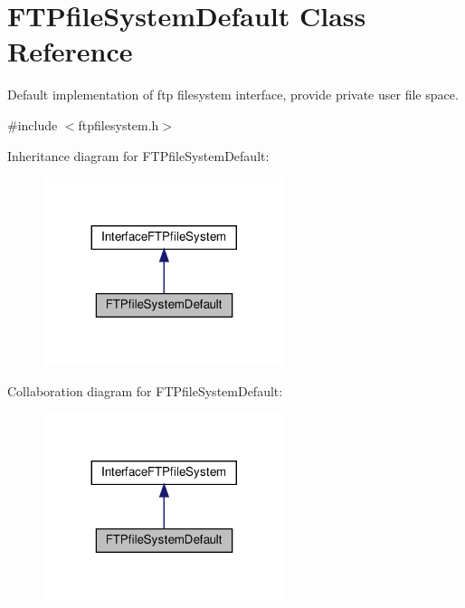 \hypertarget{classFTPfileSystemDefault}{}\section{F\+T\+Pfile\+System\+Default Class Reference}
\label{classFTPfileSystemDefault}


Default implementation of ftp filesystem interface, provide private user file space.  




{\ttfamily \#include $<$ftpfilesystem.\+h$>$}



Inheritance diagram for F\+T\+Pfile\+System\+Default\+:\nopagebreak
\begin{figure}[H]
\begin{center}
\leavevmode
\includegraphics[width=200pt]{d9/d6b/classFTPfileSystemDefault__inherit__graph}
\end{center}
\end{figure}


Collaboration diagram for F\+T\+Pfile\+System\+Default\+:\nopagebreak
\begin{figure}[H]
\begin{center}
\leavevmode
\includegraphics[width=200pt]{da/d1c/classFTPfileSystemDefault__coll__graph}
\end{center}
\end{figure}
